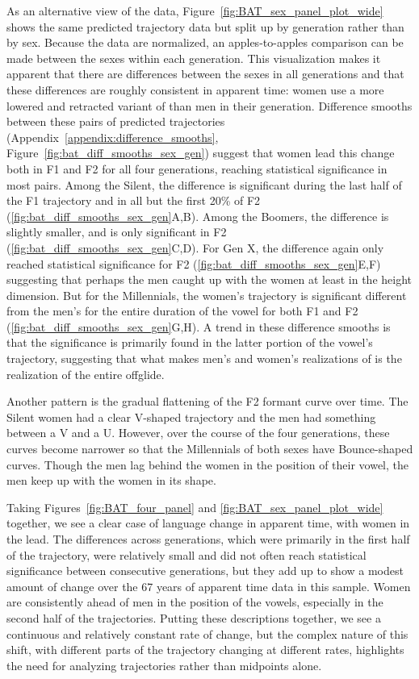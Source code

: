 As an alternative view of the data, Figure~\ref{fig:BAT_sex_panel_plot_wide} shows the same predicted trajectory data but split up by generation rather than by sex. Because the data are normalized, an apples-to-apples comparison can be made between the sexes within each generation. This visualization makes it apparent that there are differences between the sexes in all generations and that these differences are roughly consistent in apparent time: women use a more lowered and retracted variant of \bat than men in their generation. Difference smooths between these pairs of predicted trajectories (Appendix~\ref{appendix:difference_smooths}, Figure~\ref{fig:bat_diff_smooths_sex_gen}) suggest that women lead this change both in F1 and F2 for all four generations, reaching statistical significance in most pairs. Among the Silent, the difference is significant during the last half of the F1 trajectory and in all but the first 20\% of F2 (\ref{fig:bat_diff_smooths_sex_gen}A,B). Among the Boomers, the difference is slightly smaller, and is only significant in F2 (\ref{fig:bat_diff_smooths_sex_gen}C,D). For Gen X, the difference again only reached statistical significance for F2 (\ref{fig:bat_diff_smooths_sex_gen}E,F) suggesting that perhaps the men caught up with the women at least in the height dimension. But for the Millennials, the women's trajectory is significant different from the men's for the entire duration of the vowel for both F1 and F2 (\ref{fig:bat_diff_smooths_sex_gen}G,H). A trend in these difference smooths is that the significance is primarily found in the latter portion of the vowel's trajectory, suggesting that what makes men's and women's realizations of \bat is the realization of the entire offglide.

Another pattern is the gradual flattening of the F2 formant curve over time. The Silent women had a clear V-shaped trajectory and the men had something between a V and a U. However, over the course of the four generations, these curves become narrower so that the Millennials of both sexes have Bounce-shaped curves. Though the men lag behind the women in the position of their vowel, the men keep up with the women in its shape.

Taking Figures~\ref{fig:BAT_four_panel} and \ref{fig:BAT_sex_panel_plot_wide} together, we see a clear case of language change in apparent time, with women in the lead. The differences across generations, which were primarily in the first half of the trajectory, were relatively small and did not often reach statistical significance between consecutive generations, but they add up to show a modest amount of change over the 67 years of apparent time data in this sample. Women are consistently ahead of men in the position of the vowels, especially in the second half of the trajectories. Putting these descriptions together, we see a continuous and relatively constant rate of change, but the complex nature of this shift, with different parts of the trajectory changing at different rates, highlights the need for analyzing trajectories rather than midpoints alone.


